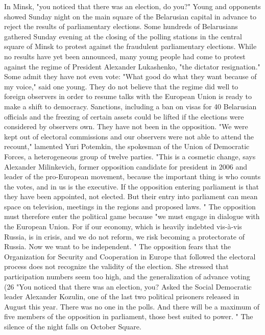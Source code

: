 In Minsk, "you noticed that there was an election, do you?"
Young and opponents showed Sunday night on the main square of the Belarusian capital in advance to reject the results of parliamentary elections.
Some hundreds of Belarusians gathered Sunday evening at the closing of the polling stations in the central square of Minsk to protest against the fraudulent parliamentary elections.
While no results have yet been announced, many young people had come to protest against the regime of President Alexander Lukashenko, "the dictator resignation."
Some admit they have not even vote: "What good do what they want because of my voice," said one young.
They do not believe that the regime did well to foreign observers in order to resume talks with the European Union is ready to make a shift to democracy.
Sanctions, including a ban on visas for 40 Belarusian officials and the freezing of certain assets could be lifted if the elections were considered by observers own.
They have not been in the opposition.
"We were kept out of electoral commissions and our observers were not able to attend the recount," lamented Yuri Potemkin, the spokesman of the Union of Democratic Forces, a heterogeneous group of twelve parties.
"This is a cosmetic change, says Alexander Milinkevich, former opposition candidate for president in 2006 and leader of the pro-European movement, because the important thing is who counts the votes, and in us is the executive.
If the opposition entering parliament is that they have been appointed, not elected.
But their entry into parliament can mean space on television, meetings in the regions and proposed laws. "
The opposition must therefore enter the political game because "we must engage in dialogue with the European Union.
For if our economy, which is heavily indebted vis-à-vis Russia, is in crisis, and we do not reform, we risk becoming a protectorate of Russia.
Now we want to be independent. "
The opposition fears that the Organization for Security and Cooperation in Europe that followed the electoral process does not recognize the validity of the election.
She stressed that participation numbers seem too high, and the generalization of advance voting (26%
"You noticed that there was an election, you? Asked the Social Democratic leader Alexander Kozulin, one of the last two political prisoners released in August this year.
There was no one in the polls.
And there will be a maximum of five members of the opposition in parliament, those best suited to power. "
The silence of the night falls on October Square.
